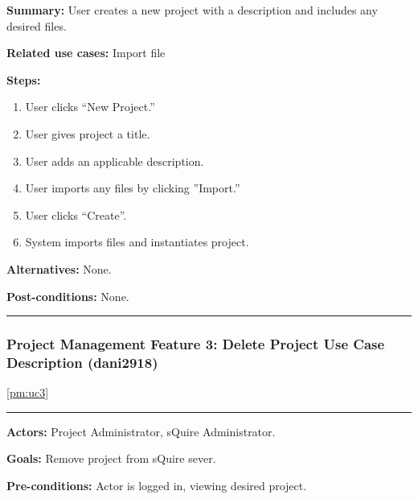 \documentclass[twoside,letterpaper]{article}
\begin{document}
	 \noindent \textbf{Summary:} User creates a new project with a description and includes any desired files. \newline
	 
	 \noindent \textbf{Related use cases:} Import file \newline
	 
	 \noindent \textbf{Steps:} \begin{enumerate}
	  \item User clicks ``New Project.''
	  \item User gives project a title.
	  \item User adds an applicable description.
	  \item User imports any files by clicking ''Import.''
	  \item User clicks ``Create''.
	  \item System imports files and instantiates project.
	 \end{enumerate}
	 \textbf{Alternatives:} None. \newline
	 
	 \noindent  \textbf{Post-conditions:} None. \newline
	
	\vspace{8pt}
	\hrule
	
	\vspace{20pt}
	
	\newpage



	\subsubsection[Project Management Feature 3: Delete Project Use Case Description (dani2918)]{\rmfamily\bfseries\color{black}
		Project Management Feature 3: Delete Project Use Case Description (dani2918)}
		\ref{pm:uc3}
	\hypertarget{RefHeading22059017292}{}
	\label{pm:uc4}
	\bigskip
	
	\vspace{2pt}
	\hrule
	\vspace{8pt}
	 \noindent \textbf{Actors:} Project Administrator, sQuire Administrator. \newline
	 
	 \noindent \textbf{Goals:} Remove project from sQuire sever. \newline
	
	 \noindent  \textbf{Pre-conditions:} Actor is logged in, viewing desired project.  \newline
	 
\end{document}

